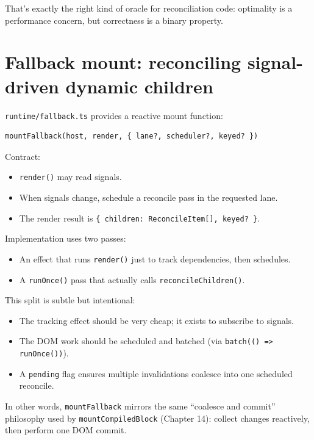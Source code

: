 That’s exactly the right kind of oracle for reconciliation code: optimality is a performance concern, but correctness is a binary property.

\section{Fallback mount: reconciling signal-driven dynamic children}

\texttt{runtime/fallback.ts} provides a reactive mount function:

\begin{verbatim}
mountFallback(host, render, { lane?, scheduler?, keyed? })
\end{verbatim}

Contract:

\begin{itemize}
  \item \texttt{render()} may read signals.
  \item When signals change, schedule a reconcile pass in the requested lane.
  \item The render result is \texttt{\{ children: ReconcileItem[], keyed? \}}.
\end{itemize}

Implementation uses two passes:

\begin{itemize}
  \item An effect that runs \texttt{render()} just to track dependencies, then schedules.
  \item A \texttt{runOnce()} pass that actually calls \texttt{reconcileChildren()}.
\end{itemize}

This split is subtle but intentional:

\begin{itemize}
  \item The tracking effect should be very cheap; it exists to subscribe to signals.
  \item The DOM work should be scheduled and batched (via \texttt{batch(() => runOnce())}).
  \item A \texttt{pending} flag ensures multiple invalidations coalesce into one scheduled reconcile.
\end{itemize}

In other words, \texttt{mountFallback} mirrors the same “coalesce and commit” philosophy used by \texttt{mountCompiledBlock} (Chapter 14): collect changes reactively, then perform one DOM commit.

